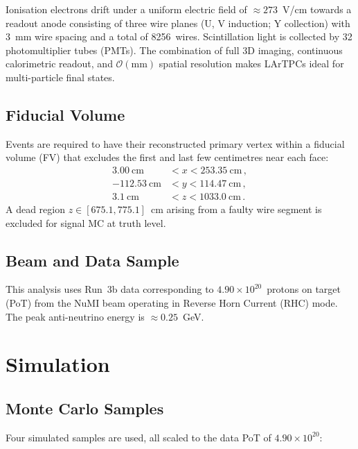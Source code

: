 \documentclass[12pt,a4paper]{article}
\begin{document}
Ionisation electrons drift under a uniform electric field of
$\approx 273$~V/cm towards a readout anode consisting of three wire
planes (U, V induction; Y collection) with 3~mm wire spacing and
a total of 8256~wires.  Scintillation light is collected by 32
photomultiplier tubes (PMTs).  The combination of full 3D imaging,
continuous calorimetric readout, and $\mathcal{O}(\text{mm})$ spatial
resolution makes LArTPCs ideal for multi-particle final states.

\subsection{Fiducial Volume}

Events are required to have their reconstructed primary vertex within
a fiducial volume (FV) that excludes the first and last few centimetres
near each face:
\begin{align}
  3.00~\text{cm} &< x < 253.35~\text{cm}\,,\\
  -112.53~\text{cm} &< y < 114.47~\text{cm}\,,\\
  3.1~\text{cm} &< z < 1033.0~\text{cm}\,.
\end{align}
A dead region $z \in [675.1, 775.1]$~cm arising from a faulty wire
segment is excluded for signal MC at truth level.

\subsection{Beam and Data Sample}

This analysis uses Run~3b data corresponding to
$4.90 \times 10^{20}$~protons on target (PoT) from the NuMI beam
operating in Reverse Horn Current (RHC) mode.  The peak anti-neutrino
energy is $\approx 0.25$~GeV.

\section{Simulation}

\subsection{Monte Carlo Samples}

Four simulated samples are used, all scaled to the data PoT of
$4.90 \times 10^{20}$:
\end{document}
